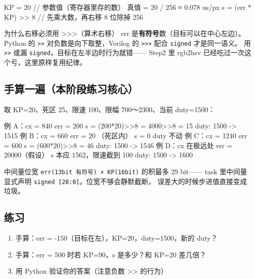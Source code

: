 \documentclass[11pt]{ctexart}
\newcommand{\code}[1]{\texttt{#1}}
\begin{document}
\begin{Verilog}
KP = 20                    // 参数值（寄存器里存的数）
真值 = 20 / 256 ≈ 0.078 us/px
s = (err * KP) >> 8        // 先乘大数，再右移 8 位除掉 256
\end{Verilog}

\begin{keybox}{为什么右移必须用 >>>（算术右移）}
err 是\textbf{有符号}数（目标可以在中心左边）。Python 的 \code{>>}
对负数是向下取整，Verilog 的 \code{>>>} 配合 \code{signed} 才是同一语义。
用 \code{>>} 或漏 \code{signed}，目标在左半边时行为就错——
Step2 里 rgb2hsv 已经吃过一次这个亏，这里原样复用纪律。
\end{keybox}

\subsection{手算一遍（本阶段练习核心）}

取 KP=20、死区 25、限速 100、限幅 700～2300、当前 duty=1500：

\begin{Verilog}
例 A：cx = 840      err = 200
      s = (200*20)>>8 = 4000>>8 = 15   duty: 1500 -> 1515
例 B：cx = 660      err = 20   （死区内）
      s = 0                            duty 不动
例 C：cx = 1240     err = 600
      s = (600*20)>>8 = 46             duty: 1500 -> 1546
例 D：cx 在极远处   err = 20000（假设）
      s 本应 1562，限速截到 100        duty: 1500 -> 1600
\end{Verilog}

\begin{warnbox}{中间量位宽}
\code{err(13bit 有符号) × KP(16bit)} 的积最多 29 bit——
task 里中间量显式声明 \code{signed [28:0]}。位宽不够会静默截断，
误差大的时候步进值直接变成垃圾。
\end{warnbox}

\subsection{练习}

\begin{enumerate}
  \item 手算：err = -150（目标在左），KP=20，duty=1500，新的 duty？
  \item 手算：err = 500 时若 KP=90，s 是多少？和 KP=20 差几倍？
  \item 用 Python 验证你的答案（注意负数 >> 的行为）
\end{enumerate}

\end{document}
